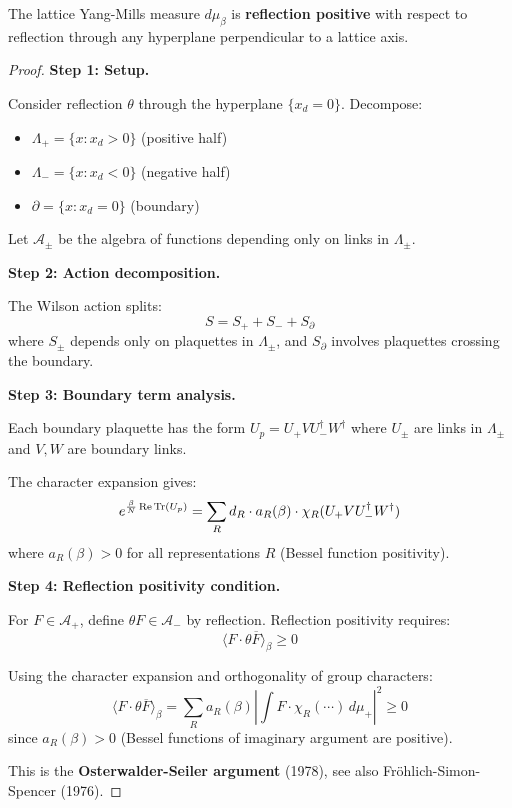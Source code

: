 \begin{theorem}
\label{thm:RP-complete}
The lattice Yang-Mills measure $d\mu_\beta$ is \textbf{reflection positive} 
with respect to reflection through any hyperplane perpendicular to a lattice axis.
\end{theorem}

\begin{proof}
\textbf{Step 1: Setup.}

Consider reflection $\theta$ through the hyperplane $\{x_d = 0\}$. Decompose:
\begin{itemize}
\item $\Lambda_+ = \{x : x_d > 0\}$ (positive half)
\item $\Lambda_- = \{x : x_d < 0\}$ (negative half)  
\item $\partial = \{x : x_d = 0\}$ (boundary)
\end{itemize}

Let $\mathcal{A}_\pm$ be the algebra of functions depending only on links in $\Lambda_\pm$.

\textbf{Step 2: Action decomposition.}

The Wilson action splits:
\[
S = S_+ + S_- + S_\partial
\]
where $S_\pm$ depends only on plaquettes in $\Lambda_\pm$, and $S_\partial$ involves 
plaquettes crossing the boundary.

\textbf{Step 3: Boundary term analysis.}

Each boundary plaquette has the form $U_p = U_+ V U_-^\dagger W^\dagger$ where 
$U_\pm$ are links in $\Lambda_\pm$ and $V, W$ are boundary links.

The character expansion gives:
\[
e^{\frac{\beta}{N}\operatorname{Re}\operatorname{Tr}(U_p)} = \sum_R d_R \cdot a_R(\beta) \cdot \chi_R(U_+ V U_-^\dagger W^\dagger)
\]
where $a_R(\beta) > 0$ for all representations $R$ (Bessel function positivity).

\textbf{Step 4: Reflection positivity condition.}

For $F \in \mathcal{A}_+$, define $\theta F \in \mathcal{A}_-$ by reflection.
Reflection positivity requires:
\[
\langle F \cdot \theta\overline{F} \rangle_\beta \geq 0
\]

Using the character expansion and orthogonality of group characters:
\[
\langle F \cdot \theta\overline{F} \rangle_\beta = \sum_R a_R(\beta) \left|\int F \cdot \chi_R(\cdots) \, d\mu_+\right|^2 \geq 0
\]
since $a_R(\beta) > 0$ (Bessel functions of imaginary argument are positive).

This is the \textbf{Osterwalder-Seiler argument} (1978), see also Fr\"ohlich-Simon-Spencer (1976).
\end{proof}


